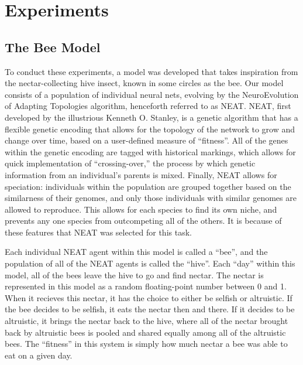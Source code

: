 \documentclass[11pt]{article}
\begin{document}

	\section{Experiments} %
	\label{sec:experiments}

		\subsection{The Bee Model} %
		\label{sub:the_bee_model}
			To conduct these experiments, a model was developed that takes inspiration from the nectar-collecting hive insect, known in some circles as the bee. Our model consists of a population of individual neural nets, evolving by the NeuroEvolution of Adapting Topologies algorithm, henceforth referred to as NEAT.\cite{neat} NEAT, first developed by the illustrious Kenneth O. Stanley, is a genetic algorithm that has a flexible genetic encoding that allows for the topology of the network to grow and change over time, based on a user-defined measure of ``fitness''. All of the genes within the genetic encoding are tagged with historical markings, which allows for quick implementation of ``crossing-over,'' the process by which genetic information from an individual's parents is mixed. Finally, NEAT allows for speciation: individuals within the population are grouped together based on the similarness of their genomes, and only those individuals with similar genomes are allowed to reproduce. This allows for each species to find its own niche, and prevents any one species from outcompeting all of the others. It is because of these features that NEAT was selected for this task.

			Each individual NEAT agent within this model is called a ``bee'', and the population of all of the NEAT agents is called the ``hive''. Each ``day'' within this model, all of the bees leave the hive to go and find nectar. The nectar is represented in this model as a random floating-point number between 0 and 1. When it recieves this nectar, it has the choice to either be selfish or altruistic. If the bee decides to be selfish, it eats the nectar then and there. If it decides to be altruistic, it brings the nectar back to the hive, where all of the nectar brought back by altruistic bees is pooled and shared equally among all of the altruistic bees. The ``fitness'' in this system is simply how much nectar a bee was able to eat on a given day.
\end{document}
